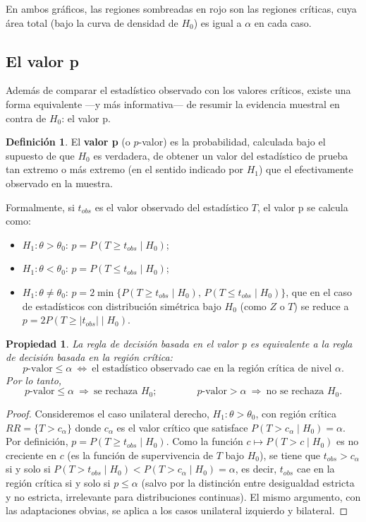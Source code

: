 \documentclass[11pt,a4paper]{article}
\theoremstyle{plain}
\newtheorem{propiedad}[teorema]{Propiedad}
\theoremstyle{definition}
\newtheorem{definicion}[teorema]{Definición}
\theoremstyle{remark}
\begin{document}
En ambos gráficos, las regiones sombreadas en rojo son las regiones críticas, cuya área total (bajo la curva de densidad de $H_0$) es igual a $\alpha$ en cada caso.

\subsection{El valor p}

Además de comparar el estadístico observado con los valores críticos, existe una forma equivalente —y más informativa— de resumir la evidencia muestral en contra de $H_0$: el valor p.

\begin{definicion}
El \textbf{valor p} (o $p$-valor) es la probabilidad, calculada bajo el supuesto de que $H_0$ es verdadera, de obtener un valor del estadístico de prueba tan extremo o más extremo (en el sentido indicado por $H_1$) que el efectivamente observado en la muestra.
\end{definicion}

Formalmente, si $t_{obs}$ es el valor observado del estadístico $T$, el valor p se calcula como:
\begin{itemize}[nosep]
\item $H_1:\theta>\theta_0$: \quad $p=P(T\ge t_{obs}\mid H_0)$;
\item $H_1:\theta<\theta_0$: \quad $p=P(T\le t_{obs}\mid H_0)$;
\item $H_1:\theta\neq\theta_0$: \quad $p=2\min\{P(T\ge t_{obs}\mid H_0),\,P(T\le t_{obs}\mid H_0)\}$, que en el caso de estadísticos con distribución simétrica bajo $H_0$ (como $Z$ o $T$) se reduce a $p=2P(T\ge|t_{obs}|\mid H_0)$.
\end{itemize}

\begin{propiedad}
La regla de decisión basada en el valor p es equivalente a la regla de decisión basada en la región crítica:
\[
p\text{-valor}\le\alpha \ \Longleftrightarrow \ \text{el estadístico observado cae en la región crítica de nivel } \alpha.
\]
Por lo tanto,
\[
p\text{-valor}\le \alpha \ \Rightarrow \ \text{se rechaza } H_0; \qquad\qquad p\text{-valor}>\alpha \ \Rightarrow \ \text{no se rechaza } H_0.
\]
\end{propiedad}

\begin{proof}
Consideremos el caso unilateral derecho, $H_1:\theta>\theta_0$, con región crítica $RR=\{T>c_\alpha\}$ donde $c_\alpha$ es el valor crítico que satisface $P(T>c_\alpha\mid H_0)=\alpha$. Por definición, $p=P(T\ge t_{obs}\mid H_0)$. Como la función $c\mapsto P(T> c\mid H_0)$ es no creciente en $c$ (es la función de supervivencia de $T$ bajo $H_0$), se tiene que $t_{obs}>c_\alpha$ si y solo si $P(T>t_{obs}\mid H_0) < P(T>c_\alpha\mid H_0)=\alpha$, es decir, $t_{obs}$ cae en la región crítica si y solo si $p\le\alpha$ (salvo por la distinción entre desigualdad estricta y no estricta, irrelevante para distribuciones continuas). El mismo argumento, con las adaptaciones obvias, se aplica a los casos unilateral izquierdo y bilateral.
\end{proof}
\end{document}
